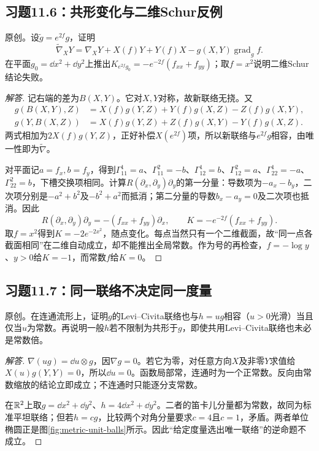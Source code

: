 \subsection*{习题11.6：共形变化与二维Schur反例}
原创。设$\widetilde g=e^{2f}g$，证明
\[
 \widetilde\nabla_XY=\nabla_XY+X(f)Y+Y(f)X-g(X,Y)\operatorname{grad}_g f.
\]
在平面$g_0=\dd x^2+\dd y^2$上推出$K_{e^{2f}g_0}=-e^{-2f}(f_{xx}+f_{yy})$；取$f=x^2$说明二维Schur结论失败。
\begin{proof}[解答]
记右端的差为$B(X,Y)$。它对$X,Y$对称，故新联络无挠。又
\begin{align*}
 g(B(X,Y),Z)&=X(f)g(Y,Z)+Y(f)g(X,Z)-Z(f)g(X,Y),\\
 g(Y,B(X,Z))&=X(f)g(Y,Z)+Z(f)g(X,Y)-Y(f)g(X,Z).
\end{align*}
两式相加为$2X(f)g(Y,Z)$，正好补偿$X(e^{2f})$项，所以新联络与$e^{2f}g$相容，由唯一性即为$\widetilde\nabla$。

对平面记$a=f_x,b=f_y$，得到$\Gamma^1_{11}=a$、$\Gamma^2_{11}=-b$、$\Gamma^1_{12}=b$、$\Gamma^2_{12}=a$、$\Gamma^1_{22}=-a$、$\Gamma^2_{22}=b$，下槽交换项相同。计算$R(\partial_x,\partial_y)\partial_y$的第一分量：导数项为$-a_x-b_y$，二次项分别是$-a^2+b^2$及$-b^2+a^2$而抵消；第二分量的导数$b_x-a_y=0$及二次项也抵消。因此
\[
 R(\partial_x,\partial_y)\partial_y=-(f_{xx}+f_{yy})\partial_x,
 \qquad K=-e^{-2f}(f_{xx}+f_{yy}).
\]
取$f=x^2$得到$K=-2e^{-2x^2}$，随点变化。每点当然只有一个二维截面，故“同一点各截面相同”在二维自动成立，却不能推出全局常数。作为号的再检查，$f=-\log y$、$y>0$给$K=-1$，而常数$f$给$K=0$。
\end{proof}

\subsection*{习题11.7：同一联络不决定同一度量}
原创。在连通流形上，证明$g$的Levi--Civita联络也与$h=ug$相容（$u>0$光滑）当且仅当$u$为常数。再说明一般$h$若不限制为共形于$g$，即使共用Levi--Civita联络也未必是常数倍。
\begin{proof}[解答]
$\nabla(ug)=\dd u\otimes g$，因$\nabla g=0$。若它为零，对任意方向$X$及非零$Y$求值给$X(u)g(Y,Y)=0$，所以$\dd u=0$。函数局部常，连通时为一个正常数。反向由常数缩放的结论立即成立；不连通时只能逐分支常数。

在$\mathbb{R}^2$上取$g=\dd x^2+\dd y^2$、$h=4\dd x^2+\dd y^2$。二者的笛卡儿分量都为常数，故同为标准平坦联络；但若$h=cg$，比较两个对角分量要求$c=4$且$c=1$，矛盾。两者单位椭圆正是图\ref{fig:metric-unit-balls}所示。因此“给定度量选出唯一联络”的逆命题不成立。
\end{proof}

